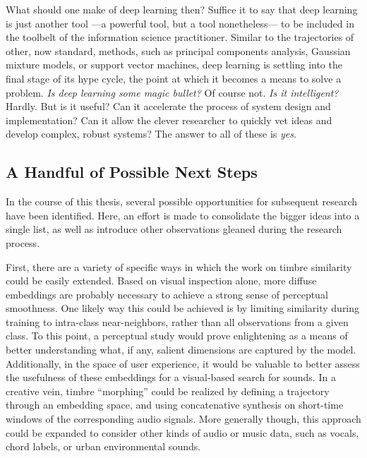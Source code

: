 What should one make of deep learning then?
Suffice it to say that deep learning is just another tool ---a powerful tool, but a tool nonetheless--- to be included in the toolbelt of the information science practitioner.
Similar to the trajectories of other, now standard, methods, such as principal components analysis, Gaussian mixture models, or support vector machines, deep learning is settling into the final stage of its hype cycle, the point at which it becomes a means to solve a problem.
\emph{Is deep learning some magic bullet?}
Of course not.
\emph{Is it intelligent?}
Hardly.
But is it useful?
Can it accelerate the process of system design and implementation?
Can it allow the clever researcher to quickly vet ideas and develop complex, robust systems?
The answer to all of these is \emph{yes}.


\subsection{A Handful of Possible Next Steps}

In the course of this thesis, several possible opportunities for subsequent research have been identified.
Here, an effort is made to consolidate the bigger ideas into a single list, as well as introduce other observations gleaned during the research process.

First, there are a variety of specific ways in which the work on timbre similarity could be easily extended.
Based on visual inspection alone, more diffuse embeddings are probably necessary to achieve a strong sense of perceptual smoothness.
One likely way this could be achieved is by limiting similarity during training to intra-class near-neighbors, rather than all observations from a given class.
To this point, a perceptual study would prove enlightening as a means of better understanding what, if any, salient dimensions are captured by the model.
Additionally, in the space of user experience, it would be valuable to better assess the usefulness of these embeddings for a visual-based search for sounds.
In a creative vein, timbre ``morphing'' could be realized by defining a trajectory through an embedding space, and using concatenative synthesis on short-time windows of the corresponding audio signals.
More generally though, this approach could be expanded to consider other kinds of audio or music data, such as vocals, chord labels, or urban environmental sounds.

